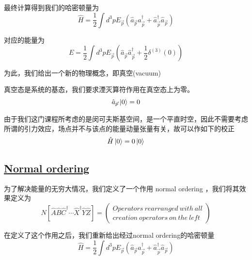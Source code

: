 \begin{itemize}
    最终计算得到我们的哈密顿量为
    \begin{equation*}
        \hat{H} = \frac{1}{2}\int d^3p E_{\vec{p}}\left(\hat{a}_{\vec{p}}\hat{a}_{\vec{p}}^\dagger + \hat{a}_{\vec{p}}^\dagger \hat{a}_{\vec{p}}\right)
    \end{equation*}

    对应的能量为
    \begin{equation*}
        E = \frac{1}{2}\int d^3p E_{\vec{p}}\left(\hat{a}_{\vec{p}}\hat{a}_{\vec{p}}^\dagger + \frac{1}{2}\delta^{(3)}(0)\right)
    \end{equation*}
\end{itemize}


为此，我们给出一个新的物理概念，即真空(vacuum)
\begin{definition}
    真空态是系统的基态，我们要求湮灭算符作用在真空态上为零。
    \begin{equation*}
        \hat{a}_{\vec{p}}\ket{0} = 0
    \end{equation*}
\end{definition}

由于我们这门课程所考虑的是闵可夫斯基空间，是一个平直时空，因此不需要考虑所谓的引力效应，场点并不与该点的能量动量张量有关，故可以作如下的校正
\begin{equation*}
    \hat{H}\ket{0} = 0\ket{0}
\end{equation*}


\subsection{\protect\hyperlink{:}{Normal ordering}}

为了解决能量的无穷大情况，我们定义了一个作用 normal ordering ，我们将其效果定义为
\begin{equation*}
    N\left[\hat{A}\hat{B}\hat{C}^\dagger\cdots \hat{X}^\dagger\hat{Y}\hat{Z}\right] = 
    \begin{pmatrix}
        Operators\ rearranged\ with\ all \\
        creation\ operators\ on\ the\ left 
    \end{pmatrix}
\end{equation*}

在定义了这个作用之后，我们重新给出经过normal ordering的哈密顿量
\begin{equation*}
    \hat{H} = \frac{1}{2}\int d^3p E_{\vec{p}}\left(\hat{a}_{\vec{p}}\hat{a}_{\vec{p}}^\dagger + \hat{a}_{\vec{p}}^\dagger \hat{a}_{\vec{p}}\right)
\end{equation*}

